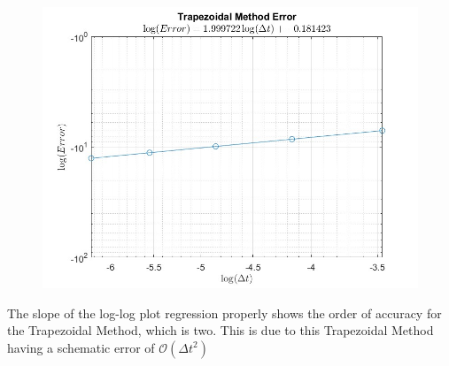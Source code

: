 \documentclass[12pt,letterpaper]{article}
\begin{document}
\begin{enumerate}
\begin{figure}[!h]
    \centering
    \includegraphics[width = 1\linewidth]{trapezoid_error.jpg}
\end{figure}

The slope of the log-log plot regression properly shows the order of accuracy for the Trapezoidal Method, which is two. 
This is due to this Trapezoidal Method having a schematic error of $\mathcal{O}(\Delta t^{2})$ 

\end{enumerate}


\newpage
\end{document}
